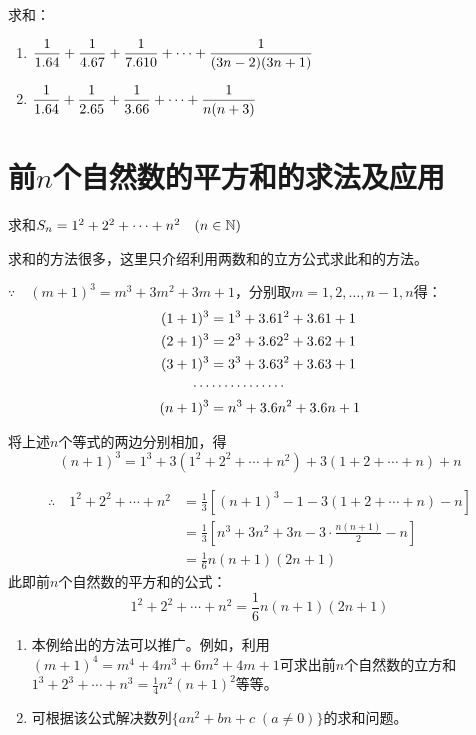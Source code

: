 \begin{ex}
求和：
\begin{enumerate}
    \item $\dfrac{1}{1.6 4}+\dfrac{1}{4.6 7}+\dfrac{1}{7.6 10}+\cdots +\dfrac{1}{(3n-2)(3n+1)}$
    \item $\dfrac{1}{1.6 4}+\dfrac{1}{2.6 5}+\dfrac{1}{3.6 6}+\cdots +\dfrac{1}{n(n+3)}$
\end{enumerate}
\end{ex}

\section{前$n$个自然数的平方和的求法及应用}

\begin{example}
    求和$S_n=1^2+2^2+\cdots +n^2\quad (n\in\mathbb{N})$
\end{example}

\begin{analyze}
    求和的方法很多，这里只介绍利用两数和的立方公式求此和的方法。
\end{analyze}

\begin{solution}
$\because\quad (m+1)^3=m^3+3m^2+3m+1$，分别取$m=1,2,\ldots,n-1,n$得：
\[\begin{split}
    (1+1)^3&=1^3+3.6 1^2+3.6 1+1\\
    (2+1)^3&=2^3+3.6 2^2+3.6 2+1\\
    (3+1)^3&=3^3+3.6 3^2+3.6 3+1\\
    \cdots&\cdots\cdots\cdots\cdots\\
    (n+1)^3&=n^3+3.6 n^2+3.6 n+1\\
\end{split}\]

将上述$n$个等式的两边分别相加，得
\[(n+1)^3=1^3+3(1^2+2^2+\cdots+n^2)+3(1+2+\cdots +n)+n\]

\[\begin{split}
\therefore\quad  1^2+2^2+\cdots +n^2 &=\frac{1}{3}\left[(n+1)^3-1-3(1+2+\cdots +n)-n\right]\\
&=\frac{1}{3}\left[n^3+3n^2+3n-3\cdot \frac{n(n+1)}{2}-n\right]\\
&=\frac{1}{6}n(n+1)(2n+1) 
\end{split}\]
此即前$n$个自然数的平方和的公式：
\[1^2+2^2+\cdots +n^2=\frac{1}{6}n(n+1)(2n+1)  \]
\end{solution}

\begin{rmk}
\begin{enumerate}
    \item 本例给出的方法可以推广。例如，利用$(m+1)^4=m^4+4m^3+6m^2+4m+1$可求出前$n$个自然数的立方和$1^3+2^3+\cdots +n^3=\frac{1}{4}n^2(n+1)^2$等等。
    \item 可根据该公式解决数列$\{an^2+bn+c\; (a\ne 0)\}$的求和问题。
\end{enumerate}
\end{rmk}

